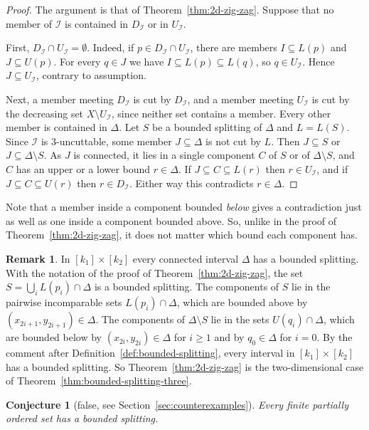 \documentclass[10pt, a4paper]{article}
\theoremstyle{plain}
\newtheorem{conjecture}[theorem]{Conjecture}
\theoremstyle{definition}
\newtheorem{remark}[theorem]{Remark}
\newcommand{\I}{\mathcal{I}}
\begin{document}
\begin{proof}
  The argument is that of Theorem~\ref{thm:2d-zig-zag}. Suppose that no member of $\I$
  is contained in $D_\I$ or in $U_\I$.

  First, $D_\I\cap U_\I=\emptyset$. Indeed, if $p\in D_\I\cap U_\I$, there are members
  $I\subseteq L(p)$ and $J\subseteq U(p)$. For every $q\in J$ we have
  $I\subseteq L(p)\subseteq L(q)$, so $q\in U_\I$. Hence $J\subseteq U_\I$, contrary to
  assumption.

  Next, a member meeting $D_\I$ is cut by $D_\I$, and a member meeting $U_\I$ is cut
  by the decreasing set $X\setminus U_\I$, since neither set contains a member. Every
  other member is contained in $\Delta$. Let $S$ be a bounded splitting of $\Delta$
  and $L=L(S)$. Since $\I$ is $3$-uncuttable, some member $J\subseteq\Delta$ is not cut
  by $L$. Then $J\subseteq S$ or $J\subseteq\Delta\setminus S$. As $J$ is connected, it
  lies in a single component $C$ of $S$ or of $\Delta\setminus S$, and $C$ has an
  upper or a lower bound $r\in\Delta$. If $J\subseteq C\subseteq L(r)$ then
  $r\in U_\I$, and if $J\subseteq C\subseteq U(r)$ then $r\in D_\I$. Either way this
  contradicts $r\in\Delta$.
\end{proof}

Note that a member inside a component bounded \emph{below} gives a contradiction just
as well as one inside a component bounded above. So, unlike in the proof of
Theorem~\ref{thm:2d-zig-zag}, it does not matter which bound each component has.

\begin{remark}
  In $[k_1]\times[k_2]$ every connected interval $\Delta$ has a bounded splitting. With
  the notation of the proof of Theorem~\ref{thm:2d-zig-zag}, the set
  $S=\bigcup_i L(p_i)\cap\Delta$ is a bounded splitting. The components of $S$ lie in
  the pairwise incomparable sets $L(p_i)\cap\Delta$, which are bounded above by
  $(x_{2i+1},y_{2i+1})\in\Delta$. The components of $\Delta\setminus S$ lie in the sets
  $U(q_i)\cap\Delta$, which are bounded below by $(x_{2i},y_{2i})\in\Delta$ for
  $i\ge 1$ and by $q_0\in\Delta$ for $i=0$. By the comment after
  Definition~\ref{def:bounded-splitting}, every interval in $[k_1]\times[k_2]$ has a
  bounded splitting. So Theorem~\ref{thm:2d-zig-zag} is the two-dimensional case of
  Theorem~\ref{thm:bounded-splitting-three}.
\end{remark}

\begin{conjecture}[false, see Section~\ref{sec:counterexamples}]\label{conj:bounded-splitting}
  Every finite partially ordered set has a bounded splitting.
\end{conjecture}
\end{document}
